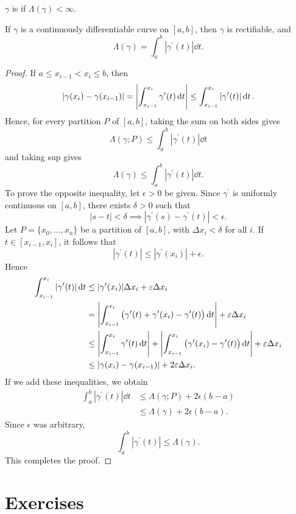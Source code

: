 \begin{definition}
$\gamma$ is  if $\Lambda(\gamma)<\infty$.
\end{definition}



\begin{proposition}
If $\gamma$ is a continuously differentiable curve on $[a,b]$, then $\gamma$ is rectifiable, and
\begin{equation}
\Lambda(\gamma)=\int_{a}^{b}|\gamma^\prime(t)|\dd{t}.
\end{equation}
\end{proposition}

\begin{proof}
If $a\le x_{i-1}<x_i\le b$, then
\[|\gamma(x_i)-\gamma(x_{i-1})|=\left|\int_{x_{i-1}}^{x_i}\gamma^\prime(t)\dd{t}\right|\le\int_{x_{i-1}}^{x_i}|\gamma^\prime(t)|\dd{t}.\]
Hence, for every partition $P$ of $[a,b]$, taking the sum on both sides gives
\[\Lambda(\gamma;P)\le\int_{a}^{b}|\gamma^\prime(t)|\dd{t}\]
and taking sup gives
\[\Lambda(\gamma)\le\int_{a}^{b}|\gamma^\prime(t)|\dd{t}.\]
To prove the opposite inequality, let $\epsilon>0$ be given. Since $\gamma^\prime$ is uniformly continuous on $[a,b]$, there exists $\delta>0$ such that
\[|s-t|<\delta\implies|\gamma^\prime(s)-\gamma^\prime(t)|<\epsilon.\]
Let $P=\{x_0,\dots,x_n\}$ be a partition of $[a,b]$, with $\Delta x_i<\delta$ for all $i$. If $t\in[x_{i-1},x_i]$, it follows that
\[|\gamma^\prime(t)|\le|\gamma^\prime(x_i)|+\epsilon.\]
Hence
\begin{align*}
\int_{x_{i-1}}^{x_i}|\gamma^\prime(t)|\dd{t}
&\le|\gamma^\prime(x_i)|\Delta x_i+\varepsilon\Delta x_i\\
&=\left|\int_{x_{i-1}}^{x_i}\left(\gamma^\prime(t)+\gamma^\prime(x_i)-\gamma^\prime(t)\right)\dd{t}\right|+\varepsilon\Delta x_i\\
&\le\left|\int_{x_{i-1}}^{x_i}\gamma^\prime(t)\dd{t}\right|+\left|\int_{x_{i-1}}^{x_i}\left(\gamma^\prime(x_i)-\gamma^\prime(t)\right)\dd{t}\right|+\varepsilon\Delta x_i\\
&\le|\gamma(x_i)-\gamma(x_{i-1})|+2\varepsilon\Delta x_i.
\end{align*}
If we add these inequalities, we obtain
\begin{align*}
\int_{a}^{b}|\gamma^\prime(t)|\dd{t}
&\le\Lambda(\gamma;P)+2\epsilon(b-a)\\
&\le\Lambda(\gamma)+2\epsilon(b-a).
\end{align*}
Since $\epsilon$ was arbitrary,
\[\int_{a}^{b}|\gamma^\prime(t)|\le\Lambda(\gamma).\]
This completes the proof. 
\end{proof}
\pagebreak

\section*{Exercises}
